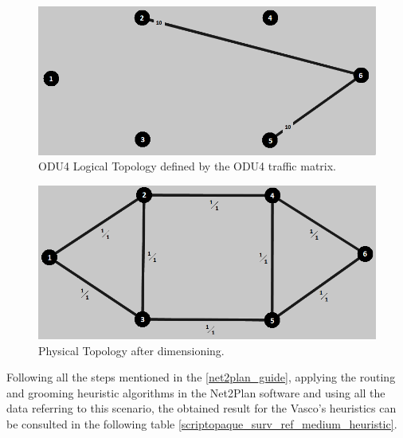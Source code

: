 \begin{figure}[H]
\centering
\includegraphics[width=13cm]{sdf/heuristic/opaque_survivability/medium/logical_topology_odu4_medium}
\caption{ODU4 Logical Topology defined by the ODU4 traffic matrix.}
\label{logical_ODU4_surv_ref_medium_heuristic}
\end{figure}

\begin{figure}[H]
\centering
\includegraphics[width=13cm]{sdf/heuristic/opaque_survivability/medium/physical_topology_medium}
\caption{Physical Topology after dimensioning.}
\label{physical_topology_surv_ref_medium_heuristic}
\end{figure}

Following all the steps mentioned in the \ref{net2plan_guide}, applying the routing and grooming heuristic algorithms in the Net2Plan software and using all the data referring to this scenario, the obtained result for the Vasco's heuristics can be consulted in the following table \ref{scriptopaque_surv_ref_medium_heuristic}.


